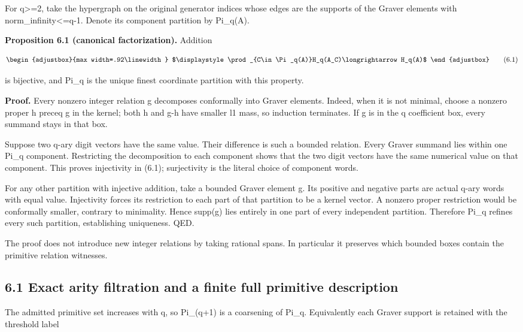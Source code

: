 For q\textgreater=2, take the hypergraph on the original generator indices whose edges are the supports of the Graver elements with norm\_infinity\textless=q-1. Denote its component partition by Pi\_q(A).

\textbf{Proposition 6.1 (canonical factorization).} Addition

\[
\begin{adjustbox}{max width=.92\linewidth}
$\displaystyle \prod_{C\in\Pi_q(A)}H_q(A_C)\longrightarrow H_q(A)$
\end{adjustbox}
\tag{6.1}
\]

is bijective, and Pi\_q is the unique finest coordinate partition with this property.

\textbf{Proof.} Every nonzero integer relation g decomposes conformally into Graver elements. Indeed, when it is not minimal, choose a nonzero proper h preceq g in the kernel; both h and g-h have smaller l1 mass, so induction terminates. If g is in the q coefficient box, every summand stays in that box.

Suppose two q-ary digit vectors have the same value. Their difference is such a bounded relation. Every Graver summand lies within one Pi\_q component. Restricting the decomposition to each component shows that the two digit vectors have the same numerical value on that component. This proves injectivity in (6.1); surjectivity is the literal choice of component words.

For any other partition with injective addition, take a bounded Graver element g. Its positive and negative parts are actual q-ary words with equal value. Injectivity forces its restriction to each part of that partition to be a kernel vector. A nonzero proper restriction would be conformally smaller, contrary to minimality. Hence supp(g) lies entirely in one part of every independent partition. Therefore Pi\_q refines every such partition, establishing uniqueness. QED.

The proof does not introduce new integer relations by taking rational spans. In particular it preserves which bounded boxes contain the primitive relation witnesses.

\subsection{6.1 Exact arity filtration and a finite full primitive description}\label{n18-exact-arity-filtration-and-a-finite-full-primitive-description}

The admitted primitive set increases with q, so Pi\_(q+1) is a coarsening of Pi\_q. Equivalently each Graver support is retained with the threshold label

